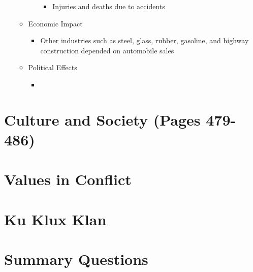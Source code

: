 \documentclass[12pt]{article} %
\begin{document}
\begin{enumerate}
\begin{itemize}
\begin{itemize}
\begin{itemize}
				\item Injuries and deaths due to accidents
			\end{itemize}
		\end{itemize}
		\item Economic Impact
		\begin{itemize}
			\item Other industries such as steel, glass, rubber, gasoline, and highway construction
				depended on automobile sales
		\end{itemize}
		\item Political Effects
		\begin{itemize}
			\item 
		\end{itemize}
	\end{itemize}
\end{enumerate}

\section{Culture and Society (Pages 479-486)}

\section{Values in Conflict}

\section{Ku Klux Klan}

\section{Summary Questions}
\end{document}
